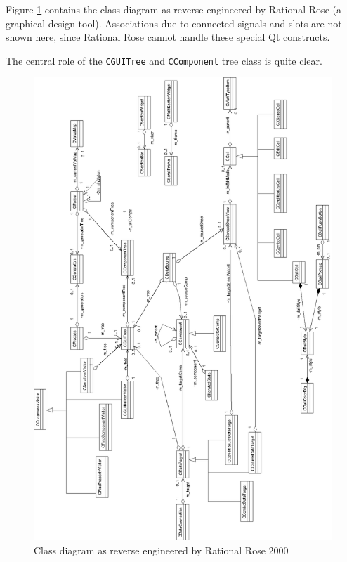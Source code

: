 \bigskip \noindent
Figure \ref{fig:design:complete_class} contains the class diagram as reverse
engineered by Rational Rose (a graphical design tool). Associations due to
connected signals and slots are not shown here, since Rational Rose cannot
handle these special Qt constructs.

The central role of the \verb=CGUITree= and \verb=CComponent= tree class is
quite clear.

\begin{figure} \begin{center}
\includegraphics[width=12cm]{./figures/complete_class_diagram.eps}
\caption{Class diagram as reverse engineered by Rational Rose 2000}
\label{fig:design:complete_class}
\end{center} \end{figure}
